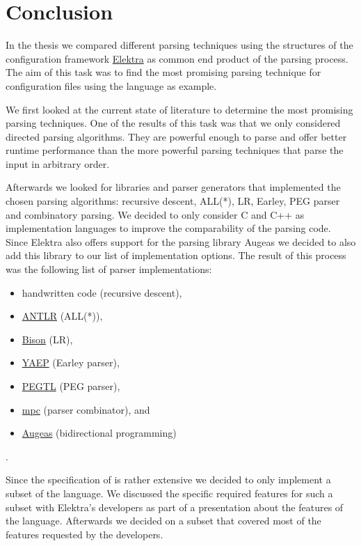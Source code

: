 \chapter{Conclusion}

In the thesis we compared different parsing techniques using the  structures of the configuration framework \href{https://www.libelektra.org}{Elektra} as common end product of the parsing process. The aim of this task was to find the most promising parsing technique for configuration files using the language  as example.

We first looked at the current state of literature to determine the most promising parsing techniques. One of the results of this task was that we only considered directed parsing algorithms. They are powerful enough to parse  and offer better runtime performance than the more powerful parsing techniques that parse the input in arbitrary order.

Afterwards we looked for libraries and parser generators that implemented the chosen parsing algorithms: recursive descent, \gls{ALL(*)}, LR, Earley, \gls{PEG} parser and combinatory parsing. We decided to only consider C and C++ as implementation languages to improve the comparability of the parsing code. Since Elektra also offers support for the parsing library Augeas we decided to also add this library to our list of implementation options. The result of this process was the following list of parser implementations:

\begin{itemize}
  \item handwritten code (recursive descent),
  \item \href{http://www.antlr.org}{ANTLR} (\gls{ALL(*)}),
  \item \href{https://www.gnu.org/software/bison}{Bison} (LR),
  \item \href{https://github.com/vnmakarov/yaep}{YAEP} (Earley parser),
  \item \href{https://github.com/taocpp/PEGTL}{PEGTL} (PEG parser),
  \item \href{https://github.com/orangeduck/mpc}{mpc} (parser combinator), and
  \item \href{http://augeas.net}{Augeas} (bidirectional programming)
\end{itemize}

.

Since the specification of  is rather extensive we decided to only implement a subset of the language. We discussed the specific required features for such a subset with Elektra’s developers as part of a presentation about the features of the language. Afterwards we decided on a subset that covered most of the features requested by the developers.

